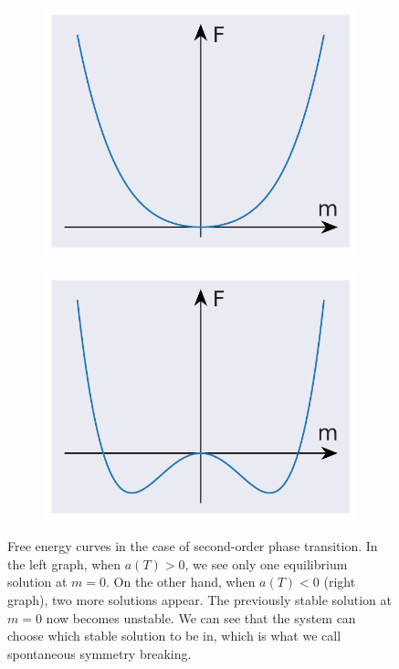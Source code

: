 \begin{figure}[H]
	\centering
	\begin{subfigure}{0.5\textwidth}
		\centering
		\includegraphics[width=0.8\columnwidth]{figures/introduction/secondOrder-a-positive.pdf}
	\end{subfigure}%
	\begin{subfigure}{0.5\textwidth}
		\centering
		\includegraphics[width=0.8\columnwidth]{figures/introduction/secondOrder-a-negative.pdf}
	\end{subfigure}
	\caption{Free energy curves in the case of second-order phase transition. In the left graph, when $a(T)>0$, we see only one equilibrium solution at $m=0$. On the other hand, when $a(T)<0$ (right graph), two more solutions appear. The previously stable solution at $m=0$ now becomes unstable. We can see that the system can choose which stable solution to be in, which is what we call spontaneous symmetry breaking.}
	\label{gr:secondOrderLandau}
\end{figure}
